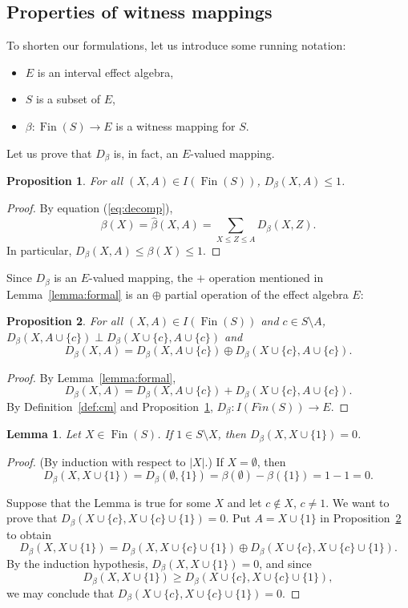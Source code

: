 \documentclass[letterpaper]{amsart}
\newtheorem{lemma}{Lemma}
\newtheorem{proposition}{Proposition}
\theoremstyle{definition}
\DeclareMathOperator*\Fin{Fin}
\begin{document}
\subsection{Properties of witness mappings}

To shorten our formulations, let us introduce some running notation:
\begin{itemize}
\item $E$ is an interval effect algebra,
\item $S$ is a subset of $E$, 
\item $\beta:\Fin(S)\to E$ is a witness mapping for $S$.
\end{itemize}

Let us prove that $D_\beta$ is, in fact, an $E$-valued mapping.

\begin{proposition}
\label{prop:Diseffect}
For all $(X,A)\in I(\Fin(S))$, $D_\beta(X,A)\leq 1$.
\end{proposition}
\begin{proof}
By equation (\ref{eq:decomp}),
$$
\beta(X)=\hat\beta(X,A)=\sum_{X\leq Z\leq A}D_\beta(X,Z).
$$
In particular, $D_\beta(X,A)\leq\beta(X)\leq 1$.
\end{proof}

Since $D_\beta$ is an $E$-valued mapping, the $+$ operation
mentioned in Lemma~\ref{lemma:formal} is an $\oplus$ partial operation of the
effect algebra $E$:
\begin{proposition}
\label{prop:base}
For all $(X,A)\in I(\Fin(S))$ and $c\in S\setminus A$,
$D_\beta(X,A\cup\{c\})\perp D_\beta(X\cup\{c\},A\cup\{c\})$ and
$$
D_\beta(X,A)=D_\beta(X,A\cup\{c\})\oplus D_\beta(X\cup\{c\},A\cup\{c\}).
$$
\end{proposition}
\begin{proof}
By Lemma~\ref{lemma:formal},
$$
D_\beta(X,A)=D_\beta(X,A\cup\{c\})+D_\beta(X\cup\{c\},A\cup\{c\}).
$$
By Definition~\ref{def:cm} and Proposition~\ref{prop:Diseffect},
$D_\beta:I(Fin(S))\to E$.
\end{proof}
\begin{lemma}\label{lemma:zero}
Let $X\in\Fin(S)$. If $1\in S\setminus X$, then $D_\beta(X,X\cup\{1\})=0$.
\end{lemma}
\begin{proof}
(By induction with respect to $|X|$.)
If $X=\emptyset$, then 
$$
D_\beta(X,X\cup\{1\})=D_\beta(\emptyset,\{1\})=\beta(\emptyset)-\beta(\{1\})=1-1=0.
$$

Suppose that the Lemma is true for some $X$ and let $c\notin X$,
$c\neq 1$. We want to prove that $D_\beta(X\cup\{c\},X\cup\{c\}\cup\{1\})=0$.
Put $A=X\cup\{1\}$ in Proposition~\ref{prop:base} to obtain
$$
D_\beta(X,X\cup\{1\})=D_\beta(X,X\cup\{c\}\cup\{1\})\oplus D_\beta(X\cup\{c\},X\cup\{c\}\cup\{1\}).
$$
By the induction hypothesis, $D_\beta(X,X\cup\{1\})=0$, and since
$$
D_\beta(X,X\cup\{1\})\geq D_\beta(X\cup\{c\},X\cup\{c\}\cup\{1\}),
$$
we may conclude that $D_\beta(X\cup\{c\},X\cup\{c\}\cup\{1\})=0$.
\end{proof}
\end{document}
